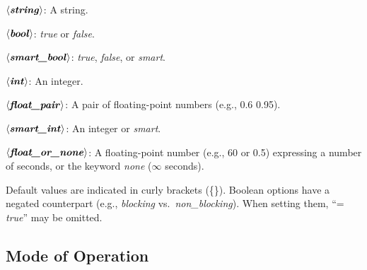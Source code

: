 \documentclass[a4paper,12pt]{article}
\def\qtybf#1{$\mathbf{\left<\textbf{\textit{#1\/}}\right>}$}
\begin{document}
\begin{enum}
\item[\labelitemi] \qtybf{string}: A string.
\item[\labelitemi] \qtybf{bool\/}: \textit{true} or \textit{false}.
\item[\labelitemi] \qtybf{smart\_bool\/}: \textit{true}, \textit{false}, or
\textit{smart}.
\item[\labelitemi] \qtybf{int\/}: An integer.
\item[\labelitemi] \qtybf{float\_pair\/}: A pair of floating-point numbers
(e.g., 0.6 0.95).
\item[\labelitemi] \qtybf{smart\_int\/}: An integer or \textit{smart}.
\item[\labelitemi] \qtybf{float\_or\_none\/}: A floating-point number (e.g., 60 or
0.5) expressing a number of seconds, or the keyword \textit{none} ($\infty$
seconds).
\end{enum}

Default values are indicated in curly brackets (\textrm{\{\}}). Boolean options
have a negated counterpart (e.g., \textit{blocking} vs.\
\textit{non\_blocking}). When setting them, ``= \textit{true\/}'' may be omitted.

\subsection{Mode of Operation}
\label{mode-of-operation}
\end{document}
